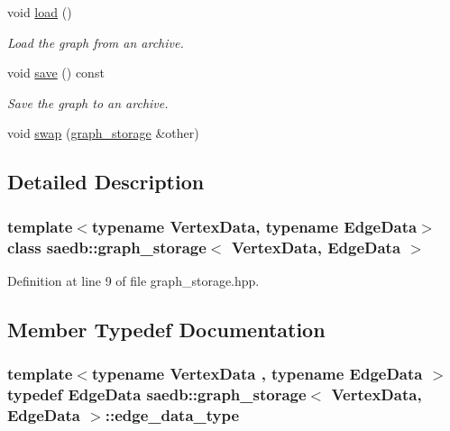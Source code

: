 \begin{DoxyCompactItemize}
\item 
void \hyperlink{classsaedb_1_1graph__storage_af03993ce65d9bc0fcb8e9738c98c6b53}{load} ()
\begin{DoxyCompactList}\small\item\em Load the graph from an archive. \end{DoxyCompactList}\item 
void \hyperlink{classsaedb_1_1graph__storage_aa567bf59138930b5577d837c2385341a}{save} () const 
\begin{DoxyCompactList}\small\item\em Save the graph to an archive. \end{DoxyCompactList}\item 
void \hyperlink{classsaedb_1_1graph__storage_ad601928088d80dd1e540b5b6f96b1185}{swap} (\hyperlink{classsaedb_1_1graph__storage}{graph\-\_\-storage} \&other)
\end{DoxyCompactItemize}


\subsection{Detailed Description}
\subsubsection*{template$<$typename Vertex\-Data, typename Edge\-Data$>$class saedb\-::graph\-\_\-storage$<$ Vertex\-Data, Edge\-Data $>$}



Definition at line 9 of file graph\-\_\-storage.\-hpp.



\subsection{Member Typedef Documentation}
\hypertarget{classsaedb_1_1graph__storage_a0b1aa3431f497cae28ac1de81c5004c2}{
\subsubsection[{edge\-\_\-data\-\_\-type}]{\setlength{\rightskip}{0pt plus 5cm}template$<$typename Vertex\-Data , typename Edge\-Data $>$ typedef Edge\-Data {\bf saedb\-::graph\-\_\-storage}$<$ Vertex\-Data, Edge\-Data $>$\-::{\bf edge\-\_\-data\-\_\-type}}}\label{db/dd8/classsaedb_1_1graph__storage_a0b1aa3431f497cae28ac1de81c5004c2}


